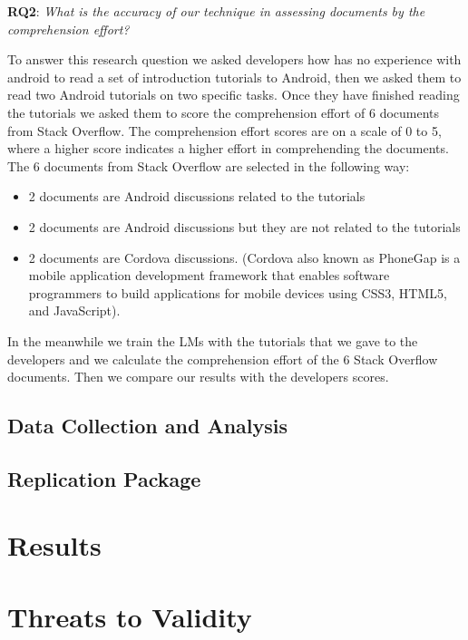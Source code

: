 \documentclass[12pt,mscthesis]{usiinfthesis}
\begin{document}
		{\textbf{RQ2}: \emph{What is the accuracy of our technique in assessing documents by the comprehension effort?}


		To answer this research question we asked developers how has no experience with android to read a set of introduction tutorials to Android, then we asked them to read two Android tutorials on two specific tasks. Once they have finished reading the tutorials we asked them to score the comprehension effort of 6 documents from Stack Overflow. The comprehension effort scores are on a scale of 0 to 5, where a higher score indicates a higher effort in comprehending the documents.\\ The 6 documents from Stack Overflow are selected in the following way:
		\begin{itemize}
			\item 2 documents are Android discussions related to the tutorials
			\item 2 documents are Android discussions but they are not related to the tutorials
			\item 2 documents are Cordova discussions. (Cordova also known as PhoneGap is a mobile application development framework that enables software programmers to build applications for mobile devices using CSS3, HTML5, and JavaScript).
		\end{itemize}
		In the meanwhile we train the LMs with the tutorials that we gave to the developers and we calculate the comprehension effort of the 6 Stack Overflow documents. Then we compare our results with the developers scores.



	\section{Data Collection and Analysis}	




	\section{Replication Package}

\chapter{Results}

\chapter{Threats to Validity}

}
\end{document}

